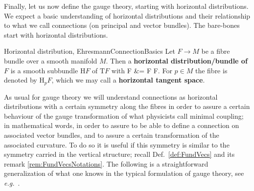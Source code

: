 \documentclass[a4paper,oneside,11pt,bibliography=totoc]{scrartcl}
\def\bas#1\eas{\begin{align*}#1\end{align*}}
\theoremstyle{plain}
\theoremstyle{remark}
\theoremstyle{definition}
\begin{document}
Finally, let us now define the gauge theory, starting with horizontal distributions. 
We expect a basic understanding of horizontal distributions and their relationship to what we call connections (on principal and vector bundles). The bare-bones start with horizontal distributions.

\begin{definitions}{Horizontal distribution, \newline \cite[\S 5.1.2, Def.\ 5.1.6, page 260; without the symmetry along right-translations here]{Hamilton}}{EhresmannConnectionBasics}
Let $F \to M$ be a fibre bundle over a smooth manifold $M$. Then a \textbf{horizontal distribution/bundle of $F$} is a smooth subbundle $\mathrm{H}F$ of $\mathrm{T}F$ with
\bas
\mathrm{T}F
&=
F \oplus {}F.
\eas
For $p \in M$ the fibre is denoted by $\mathrm{H}_p F$, which we may call a \textbf{horizontal tangent space}.
\end{definitions}

As usual for gauge theory we will understand connections as horizontal distributions with a certain symmetry along the fibres in order to assure a certain behaviour of the gauge transformation of what physicists call minimal coupling; in mathematical words, in order to assure to be able to define a connection on associated vector bundles, and to assure a certain transformation of the associated curvature.
To do so it is useful if this symmetry is similar to the symmetry carried in the vertical structure; recall Def.\ \ref{def:FundVecs} and its remark \ref{rem:FundVecsNotations}. The following is a straightforward generalization of what one knows in the typical formulation of gauge theory, see \textit{e.g.}\ \cite[\S 5.1, part 2 to 4 of Prop.\ 5.1.3, page 258f]{Hamilton}.
\end{document}
